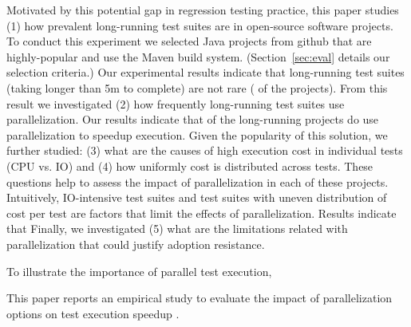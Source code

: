 Motivated by this potential gap in regression testing practice, this
paper studies (1) how prevalent long-running test suites are in
open-source software projects.  To conduct this experiment we selected
\numSubjs{} Java projects from github that are highly-popular and use
the Maven build system.  (Section~\ref{sec:eval} details our selection
criteria.)  Our experimental results indicate that long-running test
suites (taking longer than 5m to complete) are not rare ( of the
projects).  From this result we investigated (2) how frequently
long-running test suites use parallelization.  Our results indicate
that  of the long-running projects do use parallelization to
speedup execution.  Given the popularity of this solution, we further
studied: (3) what are the causes of high execution cost in individual
tests (CPU vs. IO) and (4) how uniformly cost is distributed across
tests.  These questions help to assess the impact of parallelization
in each of these projects.  Intuitively, IO-intensive test suites and
test suites with uneven distribution of cost per test are factors that
limit the effects of parallelization.  Results indicate that 
Finally, we investigated (5) what are the limitations related with
parallelization that could justify adoption resistance.

\Fix{--------------}

To illustrate the importance of parallel test execution, 

This paper reports an empirical study to evaluate the impact of
parallelization options on test execution speedup  .

